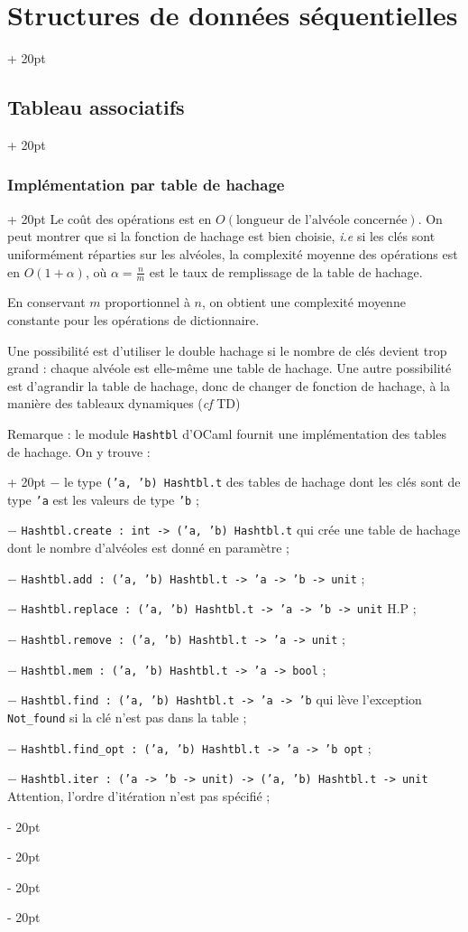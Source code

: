 \documentclass[a4paper, 12pt, twoside]{article}
\newcommand{\ind}[1][20pt]{\advance\leftskip + #1}
\newcommand{\deind}[1][20pt]{\advance\leftskip - #1}
\newenvironment{indt}[2][20pt]{#2 \par \ind[#1]}{\par \deind} %
\begin{document}
\begin{indt}{\section{Structures de données séquentielles}}
\begin{indt}{\subsection{Tableau associatifs}}
\begin{indt}{\subsubsection{Implémentation par table de hachage}}
                Le coût des opérations est en $O(\text{longueur de l'alvéole concernée})$. On peut montrer que si la fonction de hachage est bien choisie, \textit{i.e} si les clés sont uniformément réparties sur les alvéoles, la complexité moyenne des opérations est en $O(1 + \alpha)$, où $\alpha = \frac n m$ est le taux de remplissage de la table de hachage.
                
                En conservant $m$ proportionnel à $n$, on obtient une complexité moyenne constante pour les opérations de dictionnaire.
                
                Une possibilité est d'utiliser le double hachage si le nombre de clés devient trop grand : chaque alvéole est elle-même une table de hachage.
                Une autre possibilité est d'agrandir la table de hachage, donc de changer de fonction de hachage, à la manière des tableaux dynamiques (\textit{cf} TD)
                
                \vspace{6pt}
                
                \begin{indt}{Remarque : le module \texttt{Hashtbl} d'OCaml fournit une implémentation des tables de hachage. On y trouve :}
                    $-$ le type \texttt{('a, 'b) Hashtbl.t} des tables de hachage dont les clés sont de type \texttt{'a} est les valeurs de type \texttt{'b} ;
                    
                    $-$ \texttt{Hashtbl.create : int -> ('a, 'b) Hashtbl.t} qui crée une table de hachage dont le nombre d'alvéoles est donné en paramètre ;
                    
                    $-$ \texttt{Hashtbl.add : ('a, 'b) Hashtbl.t -> 'a -> 'b -> unit} ;
                    
                    $-$ \texttt{Hashtbl.replace : ('a, 'b) Hashtbl.t -> 'a -> 'b -> unit} H.P ;
                    
                    $-$ \texttt{Hashtbl.remove : ('a, 'b) Hashtbl.t -> 'a -> unit} ;
                    
                    $-$ \texttt{Hashtbl.mem : ('a, 'b) Hashtbl.t -> 'a -> bool} ;
                    
                    $-$ \texttt{Hashtbl.find : ('a, 'b) Hashtbl.t -> 'a -> 'b} qui lève l'exception \texttt{Not\_found} si la clé n'est pas dans la table ;
                    
                    $-$ \texttt{Hashtbl.find\_opt : ('a, 'b) Hashtbl.t -> 'a -> 'b opt} ;
                    
                    $-$ \texttt{Hashtbl.iter : ('a -> 'b -> unit) -> ('a, 'b) Hashtbl.t -> unit} Attention, l'ordre d'itération n'est pas spécifié ;
                \end{indt}
            \end{indt}
        \end{indt}
        
    \end{indt}
    
    
    
\end{document}
